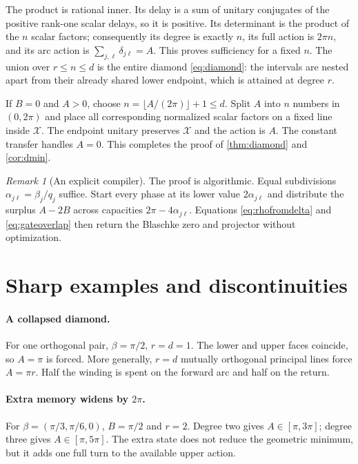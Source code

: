 \documentclass[11pt]{article}
\theoremstyle{definition}
\theoremstyle{remark}
\newtheorem{remark}[theorem]{Remark}
\begin{document}
The product is rational inner.  Its delay is a sum of unitary conjugates of
the positive rank-one scalar delays, so it is positive.  Its determinant is
the product of the $n$ scalar factors; consequently its degree is exactly
$n$, its full action is $2\pi n$, and its arc action is
$\sum_{j,\ell}\delta_{j\ell}=A$.  This proves sufficiency for a fixed $n$.
The union over $r\le n\le d$ is the entire diamond
\eqref{eq:diamond}: the intervals are nested apart from their already shared
lower endpoint, which is attained at degree $r$.

If $B=0$ and $A>0$, choose
$n=\lfloor A/(2\pi)\rfloor+1\le d$.  Split $A$ into $n$ numbers in
$(0,2\pi)$ and place all corresponding normalized scalar factors on a fixed
line inside $\mathcal X$.  The endpoint unitary preserves $\mathcal X$ and
the action is $A$.  The constant transfer handles $A=0$.  This completes the
proof of \cref{thm:diamond} and \cref{cor:dmin}.

\begin{remark}[An explicit compiler]
The proof is algorithmic.  Equal subdivisions
$\alpha_{j\ell}=\beta_j/q_j$ suffice.  Start every phase at its lower value
$2\alpha_{j\ell}$ and distribute the surplus $A-2B$ across capacities
$2\pi-4\alpha_{j\ell}$.  Equations \eqref{eq:rhofromdelta} and
\eqref{eq:gateoverlap} then return the Blaschke zero and projector without
optimization.
\end{remark}

\section{Sharp examples and discontinuities}

\paragraph{A collapsed diamond.}
For one orthogonal pair, $\beta=\pi/2$, $r=d=1$.  The lower and upper faces
coincide, so $A=\pi$ is forced.  More generally, $r=d$ mutually orthogonal
principal lines force $A=\pi r$.  Half the winding is spent on the forward
arc and half on the return.

\paragraph{Extra memory widens by $2\pi$.}
For $\beta=(\pi/3,\pi/6,0)$, $B=\pi/2$ and $r=2$.  Degree two gives
$A\in[\pi,3\pi]$; degree three gives $A\in[\pi,5\pi]$.  The extra state does
not reduce the geometric minimum, but it adds one full turn to the available
upper action.
\end{document}
